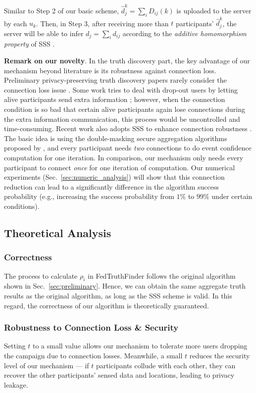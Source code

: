 Similar to Step 2 of our basic scheme, $\hat d_j^k = \sum_{i} D_{ij}(k)$ is uploaded to the server by each $u_k$. Then, in Step 3, after receiving more than $t$ participants' $\hat d_j^k$, the server will be able to infer $d_j = \sum_{i} d_{ij}$ according to the \textit{additive homomorphism property} of SSS \citep{shamir1979share}.

\textbf{Remark on our novelty}. In the truth discovery part, the key advantage of our mechanism beyond literature is its robustness against connection loss. Preliminary privacy-preserving truth discovery papers rarely consider the connection loss issue \citep{Miao2017ALP}. Some work tries to deal with drop-out users by letting alive participants send extra information \citep{Zhang2021ReliableAP,Wang2021AST}; however, when the connection condition is so bad that certain alive participants again lose connections during the extra information communication, this process would be uncontrolled and time-consuming. Recent work also adopts SSS to enhance connection robustness \citep{Xu2019EfficientAP}. The basic idea is using the double-masking secure aggregation algorithms proposed by \citet{Bonawitz2017PracticalSA}, and every participant needs \textit{two} connections to do event confidence computation for one iteration. In comparison, our mechanism only needs every participant to connect \textit{once} for one iteration of computation. Our numerical experiments (Sec.~\ref{sec:numeric_analysis}) will show that this connection reduction can lead to a significantly difference in the algorithm success probability (e.g., increasing the success probability from $1\%$ to $99\%$ under certain conditions).


\subsection{Theoretical Analysis}
\label{sub:theoretical_analysis_1}


\subsubsection{Correctness} The process to calculate $\rho_i$ in FedTruthFinder follows the original algorithm shown in Sec.~\ref{sec:preliminary}. Hence, we can obtain the same aggregate truth results as the original algorithm, as long as the SSS scheme is valid. In this regard, the correctness of our algorithm is theoretically guaranteed.


\subsubsection{Robustness to Connection Loss \& Security}
Setting $t$ to a small value allows our mechanism to tolerate more users dropping the campaign due to connection losses. Meanwhile, a small $t$ reduces the security level of our mechanism --- if $t$ participants collude with each other, they can recover the other participants' sensed data and locations, leading to privacy leakage.

